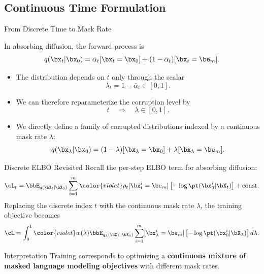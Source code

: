 \documentclass{beamer}
\begin{document}
\subsection{Continuous Time Formulation}
\begin{frame}{From Discrete Time to Mask Rate}

    In absorbing diffusion, the forward process is
    \[
        q(\bx_t | \bx_0) =
        \bar\alpha_t[\bx_t=\bx_0]
        +
        (1-\bar\alpha_t)[\bx_t=\be_m].
    \]
	\vspace{-0.5cm}
    \eqpause
	\begin{itemize}
		\item The distribution depends on $t$ only through the scalar
		\[
			\lambda_t = 1-\bar\alpha_t \in [0,1].
		\]
		\vspace{-0.5cm}
    	\eqpause
		\item We can therefore reparameterize the corruption level by
		\[
			t \quad \Rightarrow \quad \lambda \in [0,1].
		\]
		\vspace{-0.5cm}
		\eqpause
		\item We directly define a family of corrupted distributions indexed by
		a continuous mask rate $\lambda$:
		\[
			q(\bx_\lambda | \bx_0) =
			(1-\lambda)[\bx_{\lambda}=\bx_0]
			+ \lambda[\bx_{\lambda}=\be_m].
		\]
	\end{itemize}
\end{frame}
\begin{frame}{Discrete ELBO Revisited}
    Recall the per-step ELBO term for absorbing diffusion:
    \[
        \cL_t
        =
        \bbE_{q(\bX_t | \bX_0)}
        \sum_{i=1}^m
        {\color{violet}\rho_t}[\bx_t^i=\be_m]
        \left[-\log \pt(\bx_0^i | \bX_t)\right]
        + \text{const}.
    \]
    \eqpause
    Replacing the discrete index $t$ with the continuous mask rate $\lambda$,
    the training objective becomes
    \[
        \cL
        =
        \int_0^1
       {\color{violet} w(\lambda)}
        \bbE_{q_\lambda(\bX_\lambda | \bX_0)}
        \sum_{i=1}^m
        [\bx_\lambda^i=\be_m]
        \left[-\log \pt(\bx_0^i | \bX_\lambda)\right] 
		d\lambda.
    \]
    \eqpause
	\begin{block}{Interpretation}
        Training corresponds to optimizing a \textbf{continuous mixture of
        masked language modeling objectives} with different mask rates.
    \end{block}
\end{frame}
\end{document}
